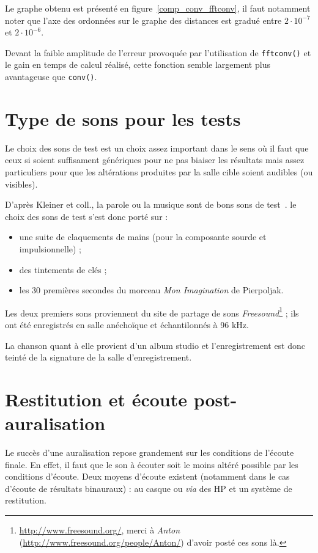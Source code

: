 Le graphe obtenu est présenté en figure~\ref{comp_conv_fftconv}, il faut notamment noter que l'axe des ordonnées sur
le graphe des distances est gradué entre $2\cdot10^{-7}$ et $2\cdot10^{-6}$.

Devant la faible amplitude de l'erreur provoquée par l'utilisation de \texttt{fftconv()} et le gain en temps de calcul
réalisé, cette fonction semble largement plus avantageuse que \texttt{conv()}.

\section{Type de sons pour les tests} %

Le choix des sons de test est un choix assez important dans le sens où il faut que ceux si soient suffisament génériques
pour ne pas biaiser les résultats mais assez particuliers pour que les altérations produites par la salle cible soient
audibles (ou visibles).

D'après Kleiner et coll., la parole ou la musique sont de bons sons de test~\cite{Kle93}. le choix des sons de test
s'est donc porté sur :

\begin{itemize}
    \item une suite de claquements de mains (pour la composante sourde et impulsionnelle) ;
    \item des tintements de clés ;
    \item les 30 premières secondes du morceau \textit{Mon Imagination} de Pierpoljak.
\end{itemize}

Les deux premiers sons proviennent du site de partage de sons
\textit{Freesound}\footnote{\url{http://www.freesound.org/}, merci à \textit{Anton}
(\url{http://www.freesound.org/people/Anton/}) d'avoir posté ces sons là.} ; ils ont été enregistrés en salle anéchoïque
et échantilonnés à 96 kHz.

La chanson quant à elle provient d'un album studio et l'enregistrement est donc teinté de la signature de la salle
d'enregistrement.

\section{Restitution et écoute post-auralisation} %

Le succès d'une auralisation repose grandement sur les conditions de l'écoute finale. En effet, il faut que le son à
écouter soit le moins altéré possible par les conditions d'écoute. Deux moyens d'écoute existent (notamment dans le cas
d'écoute de résultats binauraux) : au casque ou \textit{via} des HP et un système de restitution. 

